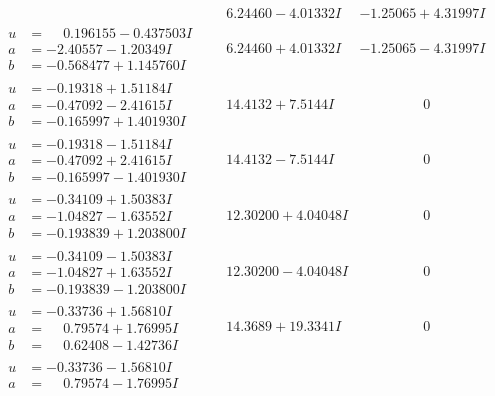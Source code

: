 \documentclass[1p]{elsarticle_modified}
\theoremstyle{definition}
\begin{document}
$$\begin{array}{c|c|c}
 & \phantom{-}6.24460 - 4.01332 I & -1.25065 + 4.31997 I \\ \hline\begin{aligned}
u &= \phantom{-}0.196155 - 0.437503 I \\
a &= -2.40557 - 1.20349 I \\
b &= -0.568477 + 1.145760 I\end{aligned}
 & \phantom{-}6.24460 + 4.01332 I & -1.25065 - 4.31997 I \\ \hline\begin{aligned}
u &= -0.19318 + 1.51184 I \\
a &= -0.47092 - 2.41615 I \\
b &= -0.165997 + 1.401930 I\end{aligned}
 & \phantom{-}14.4132 + 7.5144 I & \phantom{-0.000000 } 0 \\ \hline\begin{aligned}
u &= -0.19318 - 1.51184 I \\
a &= -0.47092 + 2.41615 I \\
b &= -0.165997 - 1.401930 I\end{aligned}
 & \phantom{-}14.4132 - 7.5144 I & \phantom{-0.000000 } 0 \\ \hline\begin{aligned}
u &= -0.34109 + 1.50383 I \\
a &= -1.04827 - 1.63552 I \\
b &= -0.193839 + 1.203800 I\end{aligned}
 & \phantom{-}12.30200 + 4.04048 I & \phantom{-0.000000 } 0 \\ \hline\begin{aligned}
u &= -0.34109 - 1.50383 I \\
a &= -1.04827 + 1.63552 I \\
b &= -0.193839 - 1.203800 I\end{aligned}
 & \phantom{-}12.30200 - 4.04048 I & \phantom{-0.000000 } 0 \\ \hline\begin{aligned}
u &= -0.33736 + 1.56810 I \\
a &= \phantom{-}0.79574 + 1.76995 I \\
b &= \phantom{-}0.62408 - 1.42736 I\end{aligned}
 & \phantom{-}14.3689 + 19.3341 I & \phantom{-0.000000 } 0 \\ \hline\begin{aligned}
u &= -0.33736 - 1.56810 I \\
a &= \phantom{-}0.79574 - 1.76995 I \\

\end{aligned}
\end{array}$$
\end{document}
